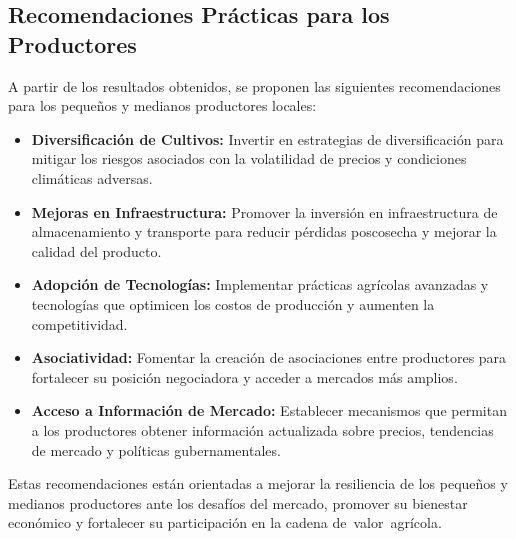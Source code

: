 \documentclass[12pt, a4paper]{article}
\begin{document}
\subsection{Recomendaciones Prácticas para los Productores}

A partir de los resultados obtenidos, se proponen las siguientes recomendaciones para los pequeños y medianos productores locales:

\begin{itemize}
    \item \textbf{Diversificación de Cultivos:} Invertir en estrategias de diversificación para mitigar los riesgos asociados con la volatilidad de precios y condiciones climáticas adversas.
    \item \textbf{Mejoras en Infraestructura:} Promover la inversión en infraestructura de almacenamiento y transporte para reducir pérdidas poscosecha y mejorar la calidad del producto.
    \item \textbf{Adopción de Tecnologías:} Implementar prácticas agrícolas avanzadas y tecnologías que optimicen los costos de producción y aumenten la competitividad.
    \item \textbf{Asociatividad:} Fomentar la creación de asociaciones entre productores para fortalecer su posición negociadora y acceder a mercados más amplios.
    \item \textbf{Acceso a Información de Mercado:} Establecer mecanismos que permitan a los productores obtener información actualizada sobre precios, tendencias de mercado y políticas gubernamentales.
\end{itemize}

Estas recomendaciones están orientadas a mejorar la resiliencia de los pequeños y medianos productores ante los desafíos del mercado, promover su bienestar económico y fortalecer su participación en la cadena de valor agrícola.
\newpage
\printbibliography
 
\end{document}
